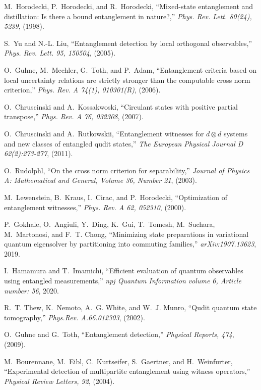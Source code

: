 \documentclass[%
 reprint,
 superscriptaddress,
 amsmath,
 amssymb,
 aps,
 longbibliography
]{revtex4-2}
\begin{document}
\begin{thebibliography}{10}
M.~Horodecki, P.~Horodecki, and R.~Horodecki, ``Mixed-state entanglement and
  distillation: Is there a bound entanglement in nature?,'' {\em Phys. Rev.
  Lett. 80(24), 5239}, (1998).

S.~Yu and N.-L. Liu, ``Entanglement detection by local orthogonal
  observables,'' {\em Phys. Rev. Lett. 95, 150504}, (2005).

O.~Guhne, M.~Mechler, G.~Toth, and P.~Adam, ``Entanglement criteria based on
  local uncertainty relations are strictly stronger than the computable cross
  norm criterion,'' {\em Phys. Rev. A 74(1), 010301(R)}, (2006).

O.~Chruscinski and A.~Kossakwoski, ``Circulant states with positive partial
  transpose,'' {\em Phys. Rev. A 76, 032308}, (2007).

O.~Chruscinski and A.~Rutkowskii, ``Entanglement witnesses for $d\otimes d$
  systems and new classes of entangled qudit states,'' {\em The European
  Physical Journal D 62(2):273-277}, (2011).

O.~Rudolphl, ``On the cross norm criterion for separability,'' {\em Journal of
  Physics A: Mathematical and General, Volume 36, Number 21}, (2003).

M.~Lewenstein, B.~Kraus, I.~Cirac, and P.~Horodecki, ``Optimization of
  entanglement witnesses,'' {\em Phys. Rev. A 62, 052310}, (2000).

P.~Gokhale, O.~Angiuli, Y.~Ding, K.~Gui, T.~Tomesh, M.~Suchara, M.~Martonosi,
  and F.~T. Chong, ``Minimizing state preparations in variational quantum
  eigensolver by partitioning into commuting families,'' {\em
  arXiv:1907.13623}, 2019.

I.~Hamamura and T.~Imamichi, ``Efficient evaluation of quantum observables
  using entangled measurements,'' {\em npj Quantum Information volume 6,
  Article number: 56}, 2020.

R.~T. Thew, K.~Nemoto, A.~G. White, and W.~J. Munro, ``Qudit quantum state
  tomography,'' {\em Phys.Rev. A.66.012303}, (2002).

O.~Guhne and G.~Toth, ``Entanglement detection,'' {\em Physical Reports, 474},
  (2009).

M.~Bourennane, M.~Eibl, C.~Kurtseifer, S.~Gaertner, and H.~Weinfurter,
  ``Experimental detection of multipartite entanglement using witness
  operators,'' {\em Physical Review Letters, 92}, (2004).


\end{thebibliography}
\end{document}
